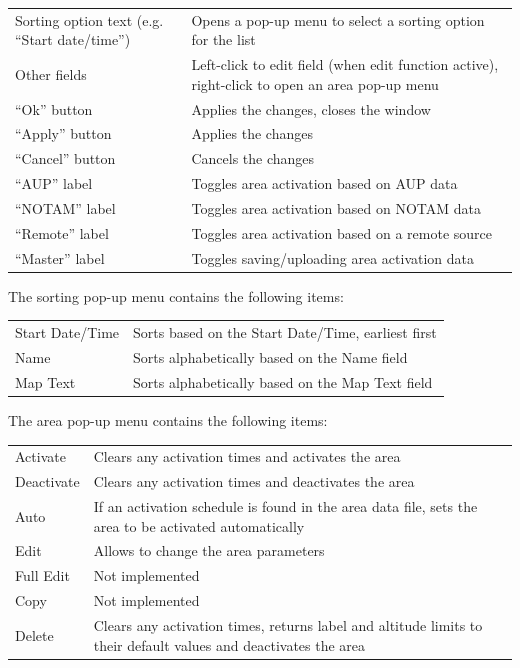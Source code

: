 \documentclass[a4paper,oneside,11pt]{memoir}
\begin{document}
\begin{longtable}{p{2.5cm} p{10cm}}
  Sorting option text (e.g. “Start date/time”)  & Opens a pop-up menu to select a sorting option for the list\\
  Other fields                                  & Left-click to edit field (when edit function active), right-click to open an area pop-up menu\\
  “Ok” button                                   &  Applies the changes, closes the window\\
  “Apply” button                                & Applies the changes\\
  “Cancel” button                               & Cancels the changes\\
  “AUP” label                                   & Toggles area activation based on AUP data \\
  “NOTAM” label                                 & Toggles area activation based on NOTAM data\\
  “Remote” label                                & Toggles area activation based on a remote source\\
  “Master” label                                & Toggles saving/uploading area activation data\\
\end{longtable}

The sorting pop-up menu contains the following items:

\begin{longtable}{p{2.5cm} p{10cm}}
  Start Date/Time   & Sorts based on the Start Date/Time, earliest first\\
  Name              & Sorts alphabetically based on the Name field\\
  Map Text          & Sorts alphabetically based on the Map Text field \\
\end{longtable}

The area pop-up menu contains the following items:

\begin{longtable}{p{2.5cm} p{10cm}}
  Activate    & Clears any activation times and activates the area\\
  Deactivate  & Clears any activation times and deactivates the area\\
  Auto        & If an activation schedule is found in the area data file, sets the area to be activated automatically\\
  Edit        & Allows to change the area parameters\\
  Full Edit   & Not implemented\\
  Copy        & Not implemented\\
  Delete      & Clears any activation times, returns label and altitude limits to their default values and deactivates the area\\
\end{longtable}
\end{document}
